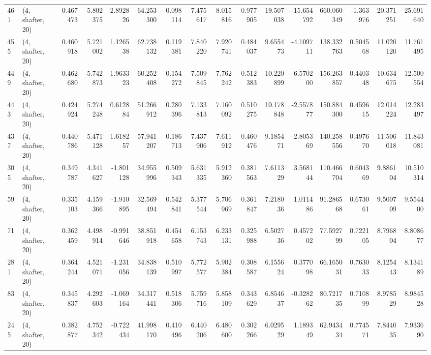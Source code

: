 \begin{tabular}{llrrrrrrrrrrrrrr}
461 &  (4, shafter, 20) &   0.467473 &   5.802375 &   2.892826 &    64.253300 &   0.098114 &   7.475617 &   8.015816 &  0.977905 &  19.507038 & -15.654792 &   660.060349 &  -1.363976 &  20.371251 &  25.691640 \\
455 &  (4, shafter, 20) &   0.460918 &   5.721002 &   1.126538 &    62.738132 &   0.119381 &   7.840220 &   7.920741 &  0.484037 &   9.655473 &  -4.109711 &   138.332763 &   0.504568 &  11.020120 &  11.761495 \\
449 &  (4, shafter, 20) &   0.462680 &   5.742873 &   1.963323 &    60.252408 &   0.154272 &   7.509845 &   7.762242 &  0.512383 &  10.220899 &  -6.570200 &   156.263857 &   0.440348 &  10.634675 &  12.500554 \\
443 &  (4, shafter, 20) &   0.424924 &   5.274248 &   0.612884 &    51.266912 &   0.280396 &   7.133813 &   7.160092 &  0.510275 &  10.178848 &  -2.557877 &   150.884300 &   0.459615 &  12.014224 &  12.283497 \\
437 &  (4, shafter, 20) &   0.440786 &   5.471128 &   1.618257 &    57.941207 &   0.186713 &   7.437906 &   7.611912 &  0.460476 &   9.185471 &  -2.805369 &   140.258556 &   0.497670 &  11.506018 &  11.843081 \\
305 &  (4, shafter, 20) &   0.349787 &   4.341627 &  -1.801128 &    34.955996 &   0.509343 &   5.631335 &   5.912360 &  0.381563 &   7.611329 &   3.568144 &   110.466704 &   0.604369 &   9.886104 &  10.510314 \\
59  &  (4, shafter, 20) &   0.335103 &   4.159366 &  -1.910895 &    32.569494 &   0.542841 &   5.377544 &   5.706969 &  0.361847 &   7.218036 &   1.011486 &    91.286568 &   0.673061 &   9.500709 &   9.554400 \\
71  &  (4, shafter, 20) &   0.362459 &   4.498914 &  -0.991646 &    38.851918 &   0.454658 &   6.153743 &   6.233131 &  0.325988 &   6.502736 &   0.457202 &    77.592799 &   0.722105 &   8.796804 &   8.808677 \\
281 &  (4, shafter, 20) &   0.364244 &   4.521071 &  -1.231056 &    34.838139 &   0.510997 &   5.772577 &   5.902384 &  0.308587 &   6.155624 &   0.377098 &    66.165031 &   0.763033 &   8.125443 &   8.134189 \\
83  &  (4, shafter, 20) &   0.345837 &   4.292603 &  -1.069164 &    34.317441 &   0.518306 &   5.759716 &   5.858109 &  0.343629 &   6.854637 &  -0.328262 &    80.721735 &   0.710899 &   8.978529 &   8.984528 \\
245 &  (4, shafter, 20) &   0.382877 &   4.752342 &  -0.722434 &    41.998170 &   0.410496 &   6.440206 &   6.480600 &  0.302266 &   6.029529 &   1.189349 &    62.943434 &   0.774571 &   7.844035 &   7.933690 \\

\end{tabular}
